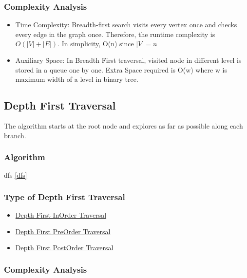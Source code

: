 \documentclass[]{book}
\providecommand{\tightlist}{%
  \setlength{\itemsep}{0pt}\setlength{\parskip}{0pt}}
\begin{document}
\hypertarget{complexity-analysis}{%
\subsubsection{Complexity Analysis}\label{complexity-analysis}}

\begin{itemize}
\tightlist
\item
  Time Complexity: Breadth-first search visits every vertex once and checks every edge in the graph once.
  Therefore, the runtime complexity is \(O(|V| + |E|)\). In simplicity, O(n) since \(|V| = n\)
\item
  Auxiliary Space: In Breadth First traversal, visited node in different level is stored in a queue one by one.
  Extra Space required is O(w) where w is maximum width of a level in binary tree.
\end{itemize}

\hypertarget{depth-first-traversal}{%
\subsection{Depth First Traversal}\label{depth-first-traversal}}

The algorithm starts at the root node and explores as far as possible along each branch.

\hypertarget{algorithm-57}{%
\subsubsection{Algorithm}\label{algorithm-57}}

dfs \ref{dfs}

\hypertarget{type-of-depth-first-traversal}{%
\subsubsection{Type of Depth First Traversal}\label{type-of-depth-first-traversal}}

\begin{itemize}
\item
  \hyperref[sec:depth_first_inorder]{Depth First InOrder Traversal}
\item
  \hyperref[sec:depth_first_preorder]{Depth First PreOrder Traversal}
\item
  \hyperref[sec:depth_first_postorder]{Depth First PostOrder Traversal}
\end{itemize}

\hypertarget{complexity-analysis-1}{%
\subsubsection{Complexity Analysis}\label{complexity-analysis-1}}
\end{document}
